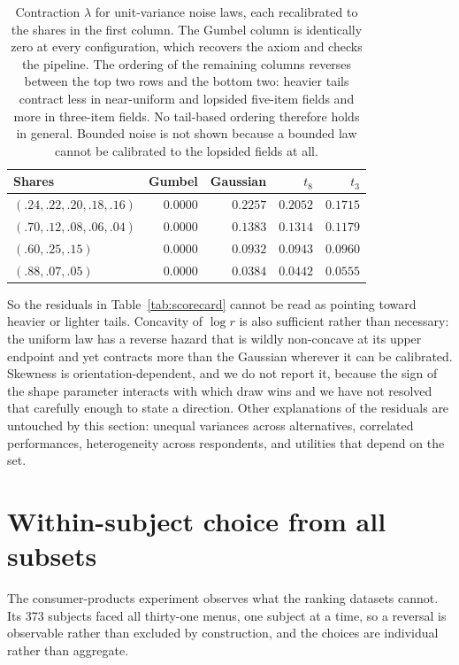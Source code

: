 \documentclass[11pt]{article}
\begin{document}
\begin{table}[ht]
\centering
\small
\begin{tabular}{lrrrr}
\toprule
Shares & Gumbel & Gaussian & $t_8$ & $t_3$ \\
\midrule
$(.24,.22,.20,.18,.16)$ & $0.0000$ & $0.2257$ & $0.2052$ & $0.1715$ \\
$(.70,.12,.08,.06,.04)$ & $0.0000$ & $0.1383$ & $0.1314$ & $0.1179$ \\
$(.60,.25,.15)$         & $0.0000$ & $0.0932$ & $0.0943$ & $0.0960$ \\
$(.88,.07,.05)$         & $0.0000$ & $0.0384$ & $0.0442$ & $0.0555$ \\
\bottomrule
\end{tabular}
\caption{Contraction $\lambda$ for unit-variance noise laws, each recalibrated to the
shares in the first column. The Gumbel column is identically zero at every
configuration, which recovers the axiom and checks the pipeline. The ordering of the
remaining columns reverses between the top two rows and the bottom two: heavier tails
contract less in near-uniform and lopsided five-item fields and more in three-item
fields. No tail-based ordering therefore holds in general. Bounded noise is not shown
because a bounded law cannot be calibrated to the lopsided fields at all.}
\label{tab:noise}
\end{table}

So the residuals in Table~\ref{tab:scorecard} cannot be read as pointing toward
heavier or lighter tails. Concavity of $\log r$ is also sufficient rather than
necessary: the uniform law has a reverse hazard that is wildly non-concave at its
upper endpoint and yet contracts more than the Gaussian wherever it can be
calibrated. Skewness is orientation-dependent, and we do not report it, because the
sign of the shape parameter interacts with which draw wins and we have not resolved
that carefully enough to state a direction. Other explanations of the residuals are
untouched by this section: unequal variances across alternatives, correlated
performances, heterogeneity across respondents, and utilities that depend on the set.

\section{Within-subject choice from all subsets}
\label{sec:experiment}

The consumer-products experiment observes what the ranking datasets cannot. Its 373
subjects faced all thirty-one menus, one subject at a time, so a
reversal is observable rather than excluded by construction, and the choices are
individual rather than aggregate.
\end{document}
